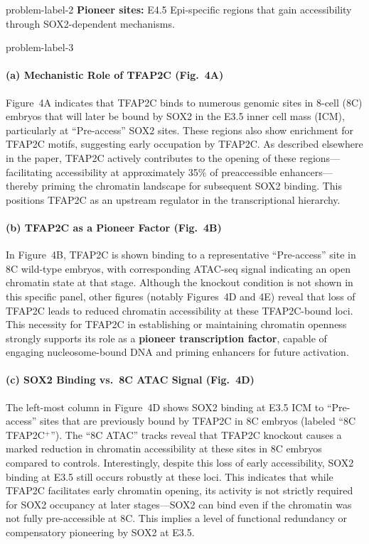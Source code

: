 \begin{multicols}{2}
\begin{problem}{}{problem-label-2}
    \textbf{Pioneer sites:} E4.5 Epi-specific regions that gain accessibility through SOX2-dependent mechanisms.   

\end{problem}

\vspace{-1.5em}  %
\begin{problem}{}{problem-label-3}
    \paragraph{(a) Mechanistic Role of TFAP2C (Fig.~4A)} 
    
    Figure~4A indicates that TFAP2C binds to numerous genomic sites in 8-cell (8C) embryos that will later be bound by SOX2 in the E3.5 inner cell mass (ICM), particularly at ``Pre-access'' SOX2 sites. These regions also show enrichment for TFAP2C motifs, suggesting early occupation by TFAP2C. As described elsewhere in the paper, TFAP2C actively contributes to the opening of these regions---facilitating accessibility at approximately 35\% of preaccessible enhancers---thereby priming the chromatin landscape for subsequent SOX2 binding. This positions TFAP2C as an upstream regulator in the transcriptional hierarchy.
    
    \paragraph{(b) TFAP2C as a Pioneer Factor (Fig.~4B)}
    
    In Figure~4B, TFAP2C is shown binding to a representative ``Pre-access'' site in 8C wild-type embryos, with corresponding ATAC-seq signal indicating an open chromatin state at that stage. Although the knockout condition is not shown in this specific panel, other figures (notably Figures~4D and 4E) reveal that loss of TFAP2C leads to reduced chromatin accessibility at these TFAP2C-bound loci. This necessity for TFAP2C in establishing or maintaining chromatin openness strongly supports its role as a \textbf{pioneer transcription factor}, capable of engaging nucleosome-bound DNA and priming enhancers for future activation.
    \paragraph{(c) SOX2 Binding vs.~8C ATAC Signal (Fig.~4D)}
    
    The left-most column in Figure~4D shows SOX2 binding at E3.5 ICM to ``Pre-access'' sites that are previously bound by TFAP2C in 8C embryos (labeled ``8C TFAP2C$^+$''). The ``8C ATAC'' tracks reveal that TFAP2C knockout causes a marked reduction in chromatin accessibility at these sites in 8C embryos compared to controls. Interestingly, despite this loss of early accessibility, SOX2 binding at E3.5 still occurs robustly at these loci. This indicates that while TFAP2C facilitates early chromatin opening, its activity is not strictly required for SOX2 occupancy at later stages---SOX2 can bind even if the chromatin was not fully pre-accessible at 8C. This implies a level of functional redundancy or compensatory pioneering by SOX2 at E3.5.
    

\end{problem}
\end{multicols}
